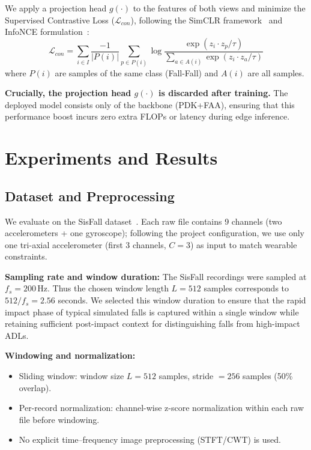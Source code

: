 \documentclass{article}
\begin{document}
We apply a projection head $g(\cdot)$ to the features of both views and minimize the Supervised Contrastive Loss ($\mathcal{L}_{con}$), following the SimCLR framework~\cite{chen2020simclr} and InfoNCE formulation~\cite{oord2018infonce}:
\begin{equation}
\mathcal{L}_{con} = \sum_{i \in I} \frac{-1}{|P(i)|} \sum_{p \in P(i)} \log \frac{\exp(z_i \cdot z_p / \tau)}{\sum_{a \in A(i)} \exp(z_i \cdot z_a / \tau)}
\end{equation}
where $P(i)$ are samples of the same class (Fall-Fall) and $A(i)$ are all samples.

\textbf{Crucially, the projection head $g(\cdot)$ is discarded after training.} The deployed model consists only of the backbone (PDK+FAA), ensuring that this performance boost incurs zero extra FLOPs or latency during edge inference.


\section{Experiments and Results}

\subsection{Dataset and Preprocessing}

We evaluate on the SisFall dataset~\cite{sucerquia2017sisfall}. Each raw file contains 9 channels (two accelerometers + one gyroscope); following the project configuration, we use only one tri-axial accelerometer (first 3 channels, $C=3$) as input to match wearable constraints.

\textbf{Sampling rate and window duration:} The SisFall recordings were sampled at $f_s = 200\,\mathrm{Hz}$. Thus the chosen window length $L=512$ samples corresponds to $512 / f_s = 2.56$ seconds. We selected this window duration to ensure that the rapid impact phase of typical simulated falls is captured within a single window while retaining sufficient post-impact context for distinguishing falls from high-impact ADLs.

\textbf{Windowing and normalization:}
\begin{itemize}
    \item Sliding window: window size $L=512$ samples, stride $=256$ samples (50\% overlap).
    \item Per-record normalization: channel-wise z-score normalization within each raw file before windowing.
    \item No explicit time--frequency image preprocessing (STFT/CWT) is used.
\end{itemize}
\end{document}
